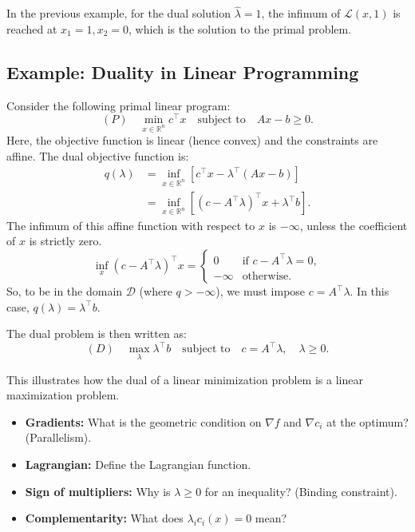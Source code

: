 \begin{remarque}
    In the previous example, for the dual solution $\hat{\lambda} = 1$, the infimum of $\mathcal{L}(x, 1)$ is reached at $x_1 = 1, x_2 = 0$, which is the solution to the primal problem.
\end{remarque}

\subsection{Example: Duality in Linear Programming}

Consider the following primal linear program:
\begin{equation}
    (P) \quad \min_{x \in \mathbb{R}^n} c^\top x \quad \text{subject to} \quad Ax - b \geq 0.
\end{equation}
Here, the objective function is linear (hence convex) and the constraints are affine. The dual objective function is:
\begin{align}
    q(\lambda) &= \inf_{x \in \mathbb{R}^n} \left[ c^\top x - \lambda^\top (Ax - b) \right] \\
    &= \inf_{x \in \mathbb{R}^n} \left[ (c - A^\top \lambda)^\top x + \lambda^\top b \right].
\end{align}
The infimum of this affine function with respect to $x$ is $-\infty$, unless the coefficient of $x$ is strictly zero.
\begin{equation}
    \inf_x (c - A^\top \lambda)^\top x = \begin{cases} 0 & \text{if } c - A^\top \lambda = 0, \\ -\infty & \text{otherwise.} \end{cases}
\end{equation}
So, to be in the domain $\mathcal{D}$ (where $q > -\infty$), we must impose $c = A^\top \lambda$. In this case, $q(\lambda) = \lambda^\top b$.

The dual problem is then written as:
\begin{equation}
    (D) \quad \max_{\lambda} \lambda^\top b \quad \text{subject to} \quad c = A^\top \lambda, \quad \lambda \geq 0.
\end{equation}

This illustrates how the dual of a linear minimization problem is a linear maximization problem.

\bigskip
\begin{checkpoint}
\begin{itemize}
    \item \textbf{Gradients:} What is the geometric condition on $\nabla f$ and $\nabla c_i$ at the optimum? (Parallelism).
    \item \textbf{Lagrangian:} Define the Lagrangian function.
    \item \textbf{Sign of multipliers:} Why is $\lambda \ge 0$ for an inequality? (Binding constraint).
    \item \textbf{Complementarity:} What does $\lambda_i c_i(x) = 0$ mean?
\end{itemize}
\end{checkpoint}

